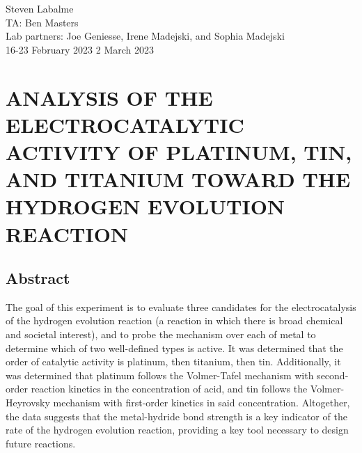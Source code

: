 \documentclass[../labs.tex]{subfiles}
\begin{document}
\large
{}



\noindent Steven Labalme\\
TA: Ben Masters\\
Lab partners: Joe Geniesse, Irene Madejski, and Sophia Madejski\\
16-23 February 2023\hfill
2 March 2023

\section{ANALYSIS OF THE ELECTROCATALYTIC ACTIVITY OF PLATINUM, TIN, AND TITANIUM TOWARD THE HYDROGEN EVOLUTION REACTION}
\subsection*{Abstract}


The goal of this experiment is to evaluate three candidates for the electrocatalysis of the hydrogen evolution reaction (a reaction in which there is broad chemical and societal interest), and to probe the mechanism over each of metal to determine which of two well-defined types is active. It was determined that the order of catalytic activity is platinum, then titanium, then tin. Additionally, it was determined that platinum follows the Volmer-Tafel mechanism with second-order reaction kinetics in the concentration of acid, and tin follows the Volmer-Heyrovsky mechanism with first-order kinetics in said concentration. Altogether, the data suggests that the metal-hydride bond strength is a key indicator of the rate of the hydrogen evolution reaction, providing a key tool necessary to design future reactions.
\end{document}
